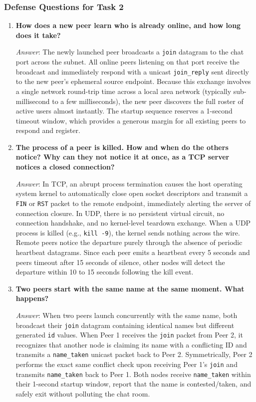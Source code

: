 \documentclass[11pt,a4paper]{article}
\begin{document}
\subsubsection{Defense Questions for Task 2}
\begin{enumerate}[label=\textbf{Q\arabic*.}, leftmargin=*]
    \item \textbf{How does a new peer learn who is already online, and how long does it take?}
    
    \textit{Answer}: The newly launched peer broadcasts a \texttt{join} datagram to the chat port across the subnet. All online peers listening on that port receive the broadcast and immediately respond with a unicast \texttt{join\_reply} sent directly to the new peer's ephemeral source endpoint. Because this exchange involves a single network round-trip time across a local area network (typically sub-millisecond to a few milliseconds), the new peer discovers the full roster of active users almost instantly. The startup sequence reserves a 1-second timeout window, which provides a generous margin for all existing peers to respond and register.

    \item \textbf{The process of a peer is killed. How and when do the others notice? Why can they not notice it at once, as a TCP server notices a closed connection?}
    
    \textit{Answer}: In TCP, an abrupt process termination causes the host operating system kernel to automatically close open socket descriptors and transmit a \texttt{FIN} or \texttt{RST} packet to the remote endpoint, immediately alerting the server of connection closure. In UDP, there is no persistent virtual circuit, no connection handshake, and no kernel-level teardown exchange. When a UDP process is killed (e.g., \texttt{kill -9}), the kernel sends nothing across the wire. Remote peers notice the departure purely through the absence of periodic heartbeat datagrams. Since each peer emits a heartbeat every 5 seconds and peers timeout after 15 seconds of silence, other nodes will detect the departure within 10 to 15 seconds following the kill event.

    \item \textbf{Two peers start with the same name at the same moment. What happens?}
    
    \textit{Answer}: When two peers launch concurrently with the same name, both broadcast their \texttt{join} datagram containing identical names but different generated \texttt{id} values. When Peer 1 receives the \texttt{join} packet from Peer 2, it recognizes that another node is claiming its name with a conflicting ID and transmits a \texttt{name\_taken} unicast packet back to Peer 2. Symmetrically, Peer 2 performs the exact same conflict check upon receiving Peer 1's \texttt{join} and transmits \texttt{name\_taken} back to Peer 1. Both nodes receive \texttt{name\_taken} within their 1-second startup window, report that the name is contested/taken, and safely exit without polluting the chat room.
\end{enumerate}
\end{document}
